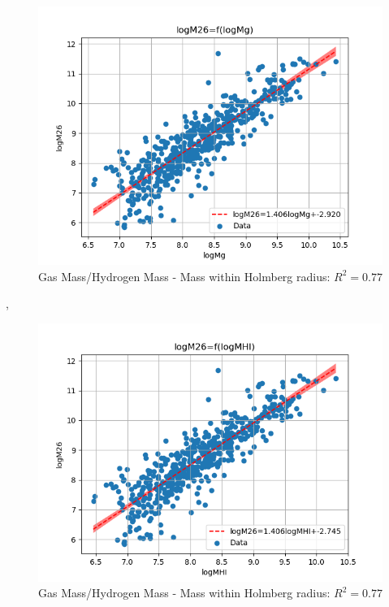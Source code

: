 \documentclass[a4paper]{article}
\begin{document}
\begin{figure}[htbp]
\centering
\includegraphics[width=.9\linewidth]{./graphs/logMg-logM26.png}
\caption{\label{Gas Mass - Mass within Holmberg radius}Gas Mass/Hydrogen Mass - Mass within Holmberg radius: \(R^2=0.77\)}
\end{figure}, \begin{figure}[htbp]
\centering
\includegraphics[width=.9\linewidth]{./graphs/logMHI-logM26.png}
\caption{\label{Gas Mass - Mass within Holmberg radius}Gas Mass/Hydrogen Mass - Mass within Holmberg radius: \(R^2=0.77\)}
\end{figure}
\end{document}
